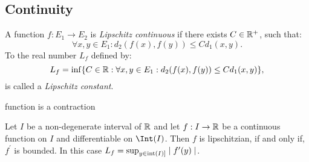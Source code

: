 \subsection{Continuity}


\begin{definition}
	A function $f: E_1 \to E_2$ is \emph{Lipschitz continuous} if there exists $C \in \mathbb{R}^+$, such that:
	\begin{equation*}
		\forall x,y \in E_1 : d_2(f(x), f(y)) \leq C d_1(x,y).
	\end{equation*}		
	To the real number $L_f$ defined by:
	\begin{equation*}
		L_f = \inf \{ C \in \mathbb{R} : \forall x,y \in E_1 : d_2(f(x),f(y)) \leq C d_1(x,y) \},
	\end{equation*}
		is called a \emph{Lipschitz constant}.
\end{definition}



\begin{definition}
	function is a contraction
\end{definition}

\begin{theorem}
	Let $I$ be a non-degenerate interval of $\mathbb{R}$ and let $f : I \to \mathbb{R}$ be a continuous function on $I$ and differentiable on $\Int(I)$. Then $f$ is lipschitzian, if and only if, $f^\prime$ is bounded. In this case $L_f = \sup _{y \in \operatorname{int}(I)]} \mid f^\prime (y) \mid$.
\end{theorem}
